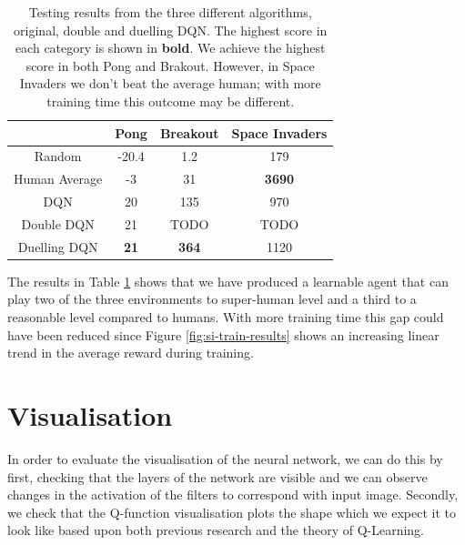 \begin{table}[htbp]
  \centering
  \begin{tabular}{c|c|c|c|}
    \cline{2-4}
    \multicolumn{1}{l|}{}               & Pong        & Breakout     & Space Invaders \\ \hline
    \multicolumn{1}{|c|}{Random}        & -20.4       & 1.2          & 179            \\ \hline
    \multicolumn{1}{|c|}{Human Average} & -3          & 31           & \textbf{3690}  \\ \hline
    \multicolumn{1}{|c|}{DQN}           & 20          & 135          & 970            \\ \hline
    \multicolumn{1}{|c|}{Double DQN}    & 21          & TODO         & TODO           \\ \hline
    \multicolumn{1}{|c|}{Duelling DQN}  & \textbf{21} & \textbf{364} & 1120           \\ \hline
  \end{tabular}
  \caption[Testing results for Original/Double/Duelling DQN]{Testing results from the three different algorithms, original, double and duelling DQN. The highest score in each category is shown in \textbf{bold}. We achieve the highest score in both Pong and Brakout. However, in Space Invaders we don't beat the average human; with more training time this outcome may be different.}\label{table:eval:testing-results}
\end{table}

The results in Table \ref{table:eval:testing-results} shows that we have produced a learnable agent that can play two of the three environments to super-human level and a third to a reasonable level compared to humans. With more training time this gap could have been reduced since Figure \ref{fig:si-train-results} shows an increasing linear trend in the average reward during training.


\section{Visualisation}
In order to evaluate the visualisation of the neural network, we can do this by first, checking that the layers of the network are visible and we can observe changes in the activation of the filters to correspond with input image. Secondly, we check that the Q-function visualisation plots the shape which we expect it to look like based upon both previous research and the theory of Q-Learning.

